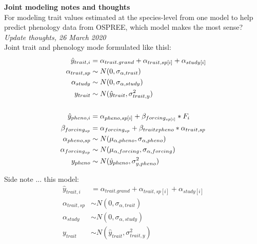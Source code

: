 \documentclass[11pt,letter]{article}
\begin{document}

\renewcommand{\refname}{\CHead{}}

{\bf Joint modeling notes and thoughts}\\


For modeling trait values estimated at the species-level from one model to help predict phenology data from OSPREE, which model makes the most sense?\\

\emph{Update thoughts, 26 March 2020}\\

Joint trait and phenology mode formulated like thisl:
\begin{align*}
\hat{y}_{trait, i} &= \alpha_{trait.grand} + \alpha_{trait, sp[i]} + \alpha_{study[i]}\\
\alpha_{trait, sp} & \sim N(0, \sigma_{\alpha, trait}) \\
\alpha_{study}  & \sim N(0, \sigma_{\alpha, study})\\
y_{trait}& \sim N(\hat{y}_{trait},\sigma^2_{trait, y}) \\
\vspace{1ex}\\
\hat{y}_{pheno, i} &= \alpha_{pheno, sp[i]} + \beta_{forcing_{sp[i]}}*F_i \\
\beta_{forcing_{sp}} & = \alpha_{forcing_{sp}} + \beta_{trait x pheno}*\alpha_{trait, sp} \\
\alpha_{pheno, sp} & \sim N(\mu_{\alpha, pheno}, \sigma_{\alpha, pheno}) \\
\alpha_{forcing_{sp}} & \sim N(\mu_{\alpha, forcing}, \sigma_{\alpha, forcing})\\
y_{pheno} & \sim N(\hat{y}_{pheno},\sigma^2_{y, pheno}) 
\end{align*}

\vspace{5ex}
Side note ... this model:
\begin{align*}
\hat{y}_{trait, i} &= \alpha_{trait.grand} + \alpha_{trait, sp[i]} + \alpha_{study[i]}\\
\alpha_{trait, sp} & \sim N(0, \sigma_{\alpha, trait}) \\
\alpha_{study}  & \sim N(0, \sigma_{\alpha, study})\\
y_{trait}& \sim N(\hat{y}_{trait},\sigma^2_{trait, y}) \\
\end{align*}
\end{document}
